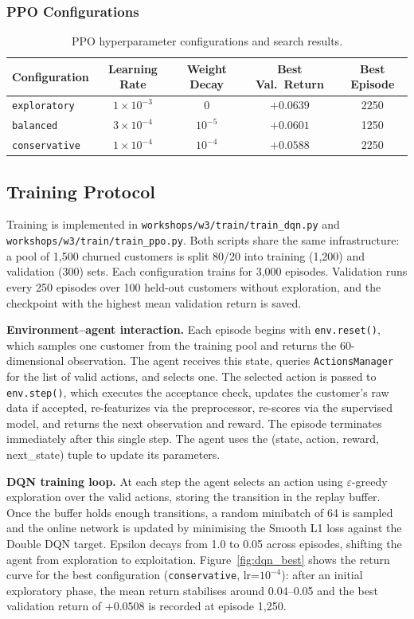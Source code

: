 \documentclass{article}
\begin{document}
\subsubsection{PPO Configurations}

\begin{table}[H]
\centering
\caption{PPO hyperparameter configurations and search results.}
\begin{tabular}{lcccc}
\toprule
\textbf{Configuration} & \textbf{Learning Rate} & \textbf{Weight Decay} & \textbf{Best Val.\ Return} & \textbf{Best Episode} \\
\midrule
\texttt{exploratory}  & $1\times10^{-3}$ & $0$         & $+0.0639$ & 2250 \\
\texttt{balanced}     & $3\times10^{-4}$ & $10^{-5}$   & $+0.0601$ & 1250 \\
\texttt{conservative} & $1\times10^{-4}$ & $10^{-4}$   & $+0.0588$ & 2250 \\
\bottomrule
\end{tabular}
\end{table}

\subsection{Training Protocol}

Training is implemented in \texttt{workshops/w3/train/train\_dqn.py} and
\texttt{workshops/w3/train/train\_ppo.py}. Both scripts share the same
infrastructure: a pool of 1{,}500 churned customers is split 80/20 into training
(1{,}200) and validation (300) sets. Each configuration trains for 3{,}000 episodes.
Validation runs every 250 episodes over 100 held-out customers without exploration,
and the checkpoint with the highest mean validation return is saved.

\textbf{Environment--agent interaction.}
Each episode begins with \texttt{env.reset()}, which samples one customer from the
training pool and returns the 60-dimensional observation. The agent receives this
state, queries \texttt{ActionsManager} for the list of valid actions, and selects
one. The selected action is passed to \texttt{env.step()}, which executes the
acceptance check, updates the customer's raw data if accepted, re-featurizes via
the preprocessor, re-scores via the supervised model, and returns the next
observation and reward. The episode terminates immediately after this single step.
The agent uses the (state, action, reward, next\_state) tuple to update its
parameters.

\textbf{DQN training loop.}
At each step the agent selects an action using $\varepsilon$-greedy exploration over
the valid actions, storing the transition in the replay buffer. Once the buffer
holds enough transitions, a random minibatch of 64 is sampled and the online network
is updated by minimising the Smooth L1 loss against the Double DQN target. Epsilon
decays from 1.0 to 0.05 across episodes, shifting the agent from exploration to
exploitation. Figure~\ref{fig:dqn_best} shows the return curve for the best
configuration (\texttt{conservative}, lr=$10^{-4}$): after an initial exploratory phase,
the mean return stabilises around 0.04--0.05 and the best validation return of $+0.0508$
is recorded at episode 1{,}250.
\end{document}
